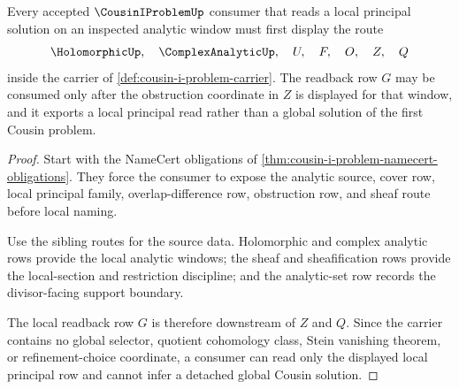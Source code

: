 \begin{theorem}
\label{thm:cousin-i-problem-local-principal-readback}
Every accepted $\CousinIProblemUp$ consumer that reads a local principal solution on an inspected analytic window must first display the route
$$
\HolomorphicUp,\quad \ComplexAnalyticUp,\quad U,\quad F,\quad O,\quad Z,\quad Q
$$
inside the carrier of \autoref{def:cousin-i-problem-carrier}. The readback row $G$ may be consumed only after the obstruction coordinate in $Z$ is displayed for that window, and it exports a local principal read rather than a global solution of the first Cousin problem.
\end{theorem}
\begin{proof}
Start with the NameCert obligations of \autoref{thm:cousin-i-problem-namecert-obligations}. They force the consumer to expose the analytic source, cover row, local principal family, overlap-difference row, obstruction row, and sheaf route before local naming.

Use the sibling routes for the source data. Holomorphic and complex analytic rows provide the local analytic windows; the sheaf and sheafification rows provide the local-section and restriction discipline; and the analytic-set row records the divisor-facing support boundary.

The local readback row $G$ is therefore downstream of $Z$ and $Q$. Since the carrier contains no global selector, quotient cohomology class, Stein vanishing theorem, or refinement-choice coordinate, a consumer can read only the displayed local principal row and cannot infer a detached global Cousin solution.
\end{proof}




